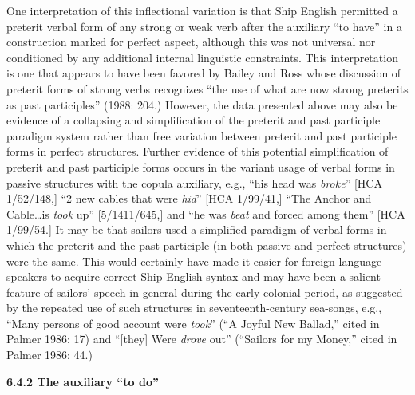 \begin{styleStandard}
One interpretation of this inflectional variation is that Ship English permitted a preterit verbal form of any strong or weak verb after the auxiliary “to have” in a construction marked for perfect aspect, although this was not universal nor conditioned by any additional internal linguistic constraints. This interpretation is one that appears to have been favored by Bailey and Ross whose discussion of preterit forms of strong verbs recognizes “the use of what are now strong preterits as past participles” (1988: 204.) However, the data presented above may also be evidence of a collapsing and simplification of the preterit and past participle paradigm system rather than free variation between preterit and past participle forms in perfect structures. Further evidence of this potential simplification of preterit and past participle forms occurs in the variant usage of verbal forms in passive structures with the copula auxiliary, e.g., “his head was \textit{broke}” [HCA 1/52/148,] “2 new cables that were \textit{hid}” [HCA 1/99/41,] “The Anchor and Cable…is \textit{took} up” [5/1411/645,] and “he was \textit{beat} and forced among them” [HCA 1/99/54.] It may be that sailors used a simplified paradigm of verbal forms in which the preterit and the past participle (in both passive and perfect structures) were the same. This would certainly have made it easier for foreign language speakers to acquire correct Ship English syntax and may have been a salient feature of sailors’ speech in general during the early colonial period, as suggested by the repeated use of such structures in seventeenth-century sea-songs, e.g., “Many persons of good account were \textit{took}” (“A Joyful New Ballad,” cited in Palmer 1986: 17) and “[they] Were \textit{drove} out” (“Sailors for my Money,” cited in Palmer 1986: 44.) 
\end{styleStandard}

\begin{styleStandard}
\textbf{6.4.2 The auxiliary “to do”}
\end{styleStandard}

